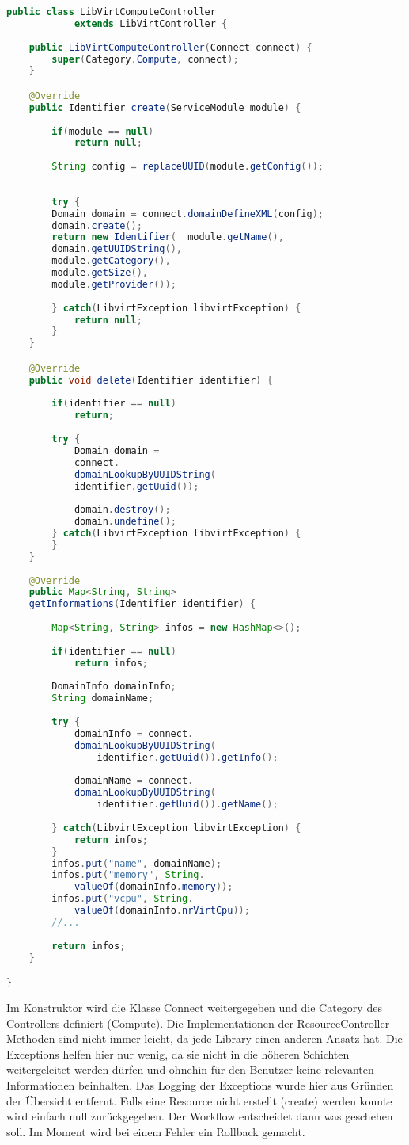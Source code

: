 \begin{lstlisting}[language=Java,frame=single] 
public class LibVirtComputeController 
			extends LibVirtController {
	
	public LibVirtComputeController(Connect connect) {
		super(Category.Compute, connect);
	}

	@Override
	public Identifier create(ServiceModule module) {
		
		if(module == null)
			return null;
		
		String config = replaceUUID(module.getConfig());
		
	
		try {
		Domain domain = connect.domainDefineXML(config);
		domain.create();
		return new Identifier(	module.getName(),
		domain.getUUIDString(), 
		module.getCategory(), 
		module.getSize(), 
		module.getProvider());
									
		} catch(LibvirtException libvirtException) {
			return null;
		}
	}

	@Override
	public void delete(Identifier identifier) {
		
		if(identifier == null)
			return;
		
		try {
			Domain domain = 
			connect.
			domainLookupByUUIDString(
			identifier.getUuid());
			
			domain.destroy();
			domain.undefine();
		} catch(LibvirtException libvirtException) {
		}
	}
	
	@Override
	public Map<String, String> 
	getInformations(Identifier identifier) {
		
		Map<String, String> infos = new HashMap<>();
		
		if(identifier == null)
			return infos;
		
		DomainInfo domainInfo;
		String domainName;
		
		try {
			domainInfo = connect.
			domainLookupByUUIDString(
				identifier.getUuid()).getInfo();
			
			domainName = connect.
			domainLookupByUUIDString(
				identifier.getUuid()).getName();
			
		} catch(LibvirtException libvirtException) {
			return infos;
		}
		infos.put("name", domainName);
		infos.put("memory", String.
			valueOf(domainInfo.memory));
		infos.put("vcpu", String.
			valueOf(domainInfo.nrVirtCpu));
		//...
		
		return infos;
	}

}
\end{lstlisting}
Im Konstruktor wird die Klasse Connect weitergegeben und die Category des 
Controllers definiert (Compute). Die Implementationen der ResourceController 
Methoden sind nicht immer leicht, da jede Library einen anderen Ansatz hat. 
Die Exceptions helfen hier nur wenig, da sie nicht in die höheren Schichten weitergeleitet werden 
dürfen und ohnehin für den Benutzer keine relevanten Informationen beinhalten. Das Logging der
 Exceptions wurde hier aus Gründen der Übersicht entfernt. Falls eine Resource nicht erstellt (create) 
 werden konnte wird einfach null zurückgegeben. Der Workflow entscheidet dann was geschehen soll. 
 Im Moment wird bei einem Fehler ein Rollback gemacht.

